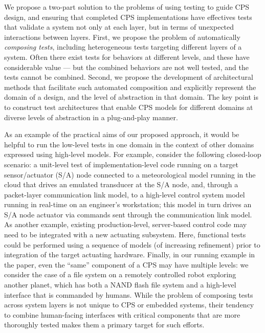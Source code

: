 We propose a two-part solution to the problems of using testing to guide CPS design, and ensuring that completed CPS implementations have effectives tests that validate a system not only at each layer, but in terms of unexpected interactions between layers.  First, we propose the problem of automatically \emph{composing tests}, including heterogeneous tests targeting different layers of a system.  Often there exist tests for behaviors at different levels, and these have considerable value --- but the combined behaviors are not well tested, and the tests cannot be combined.  Second, we propose the development of architectural methods that facilitate such automated composition and explicitly represent the domain of a design, and the level of abstraction in that domain.  The key point is to construct test architectures  that enable CPS models for different domains at diverse levels of abstraction in a plug-and-play manner.

As an example of the practical aims of our proposed approach, it would be helpful to run the low-level tests in one domain in the context of other domains expressed using high-level models. For example, consider the following closed-loop scenario: a unit-level test of implementation-level code running on a target sensor/actuator (S/A) node connected to a meteorological model running in the cloud that drives an emulated transducer at the S/A node, and, through a packet-layer communication link model, to a high-level control system model running in real-time on an engineer's workstation; this model in turn drives an S/A node actuator via commands sent through the communication link model. As another example, existing production-level, server-based control code may need to be integrated with a new actuating subsystem. Here, functional tests could be performed using a sequence of models (of increasing refinement) prior to integration of the target actuating hardware.  Finally, in our running example in the paper, even the ``same'' component of a CPS may have multiple levels:  we consider the case of a file system on a remotely controlled robot exploring another planet, which has both a NAND flash file system and a high-level interface that is commanded by humans.  While the problem of composing tests across system layers is not unique to CPS or embedded systems, their tendency to combine human-facing interfaces with critical components that are more thoroughly tested makes them a primary target for such efforts.